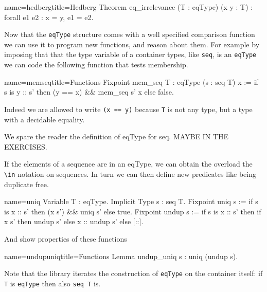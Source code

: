 \begin{coq}{name=hedberg}{title=Hedberg}
Theorem eq_irrelevance (T : eqType) (x y : T) : forall e1 e2 : x = y, e1 = e2.
\end{coq}

Now that the \lstinline/eqType/ structure comes with a well
specified comparison function we can use it to program new
functions, and reason about them.  For example by imposing
that that the type variable of a container types, like \lstinline/seq/,
is an \lstinline/eqType/ we can code the following function
that tests membership.

\begin{coq}{name=memseq}{title=Functions}
Fixpoint mem_seq {T : eqType} (s : seq T) x :=
  if s is y :: s' then (y == x) && mem_seq s' x else false.
\end{coq}

Indeed we are allowed to write \lstinline/(x == y)/ because
\lstinline/T/ is not any type, but a type with a decidable
equality.

We spare the reader the definition of eqType for seq.
MAYBE IN THE EXERCISES.

If the elements of a sequence are in an eqType, we can obtain
the overload the \lstinline/\in/ notation on sequences.
In turn we can then define new predicates like being duplicate free.

\begin{coq}{name=uniq}{}
Variable T : eqType.
Implicit Type s : seq T.
Fixpoint uniq s :=
  if s is x :: s' then (x \notin s') && uniq s' else true.
Fixpoint undup s :=
  if s is x :: s' then
    if x \in s' then undup s' else x :: undup s'
  else [::].
\end{coq}

And show properties of these functions

\begin{coq}{name=undupuniq}{title=Functions}
Lemma undup_uniq s : uniq (undup s).
\end{coq}


Note that the \mcbMC{} library iterates the construction of
\lstinline/eqType/ on the container itself:
if \lstinline/T/ is \lstinline/eqType/ then also \lstinline/seq T/ is.

